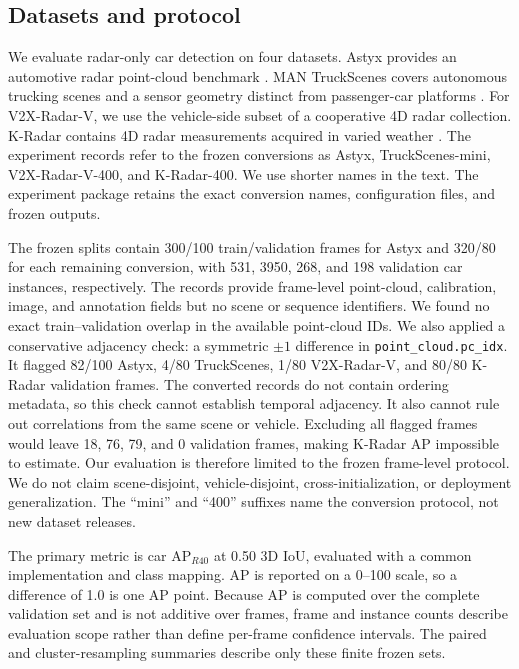 \documentclass[sensors,article,submit,pdftex,moreauthors]{Definitions/mdpi}
\begin{document}
\subsection{Datasets and protocol}

We evaluate radar-only car detection on four datasets. Astyx provides an
automotive radar point-cloud benchmark \cite{meyer2019astyx}. MAN TruckScenes
covers autonomous trucking scenes and a sensor geometry distinct from
passenger-car platforms \cite{fent2024truckscenes}.
For V2X-Radar-V, we use the vehicle-side subset of a cooperative 4D radar
collection. K-Radar contains 4D radar measurements acquired in varied weather
\cite{paek2022kradar,yang2024v2xradar}. The experiment records refer to the
frozen conversions as Astyx, TruckScenes-mini, V2X-Radar-V-400, and
K-Radar-400. We use shorter names in the text. The experiment package retains
the exact conversion names, configuration files, and frozen outputs.

The frozen splits contain 300/100 train/validation frames for Astyx and 320/80
for each remaining conversion, with 531, 3950, 268, and 198 validation car
instances, respectively. The records provide frame-level point-cloud,
calibration, image, and annotation fields but no scene or sequence identifiers.
We found no exact train--validation overlap in the available point-cloud IDs.
We also applied a conservative adjacency check: a symmetric $\pm1$ difference
in \texttt{point\_cloud.pc\_idx}. It flagged 82/100 Astyx, 4/80 TruckScenes,
1/80 V2X-Radar-V, and 80/80 K-Radar validation frames. The converted records
do not contain ordering metadata, so this check cannot establish temporal
adjacency. It also cannot rule out correlations from the same scene or
vehicle. Excluding all flagged frames would leave 18, 76, 79, and 0 validation
frames, making K-Radar AP impossible to estimate. Our evaluation is therefore
limited to the frozen frame-level protocol. We do not claim scene-disjoint,
vehicle-disjoint, cross-initialization, or deployment generalization. The
``mini'' and ``400'' suffixes name the conversion protocol, not new dataset
releases.

The primary metric is car AP$_{R40}$ at 0.50 3D IoU, evaluated with a common
implementation and class mapping. AP is reported on a 0--100 scale, so a
difference of 1.0 is one AP point. Because AP is computed over the complete
validation set and is not additive over frames, frame and instance counts
describe evaluation scope rather than define per-frame confidence intervals.
The paired and cluster-resampling summaries describe only these finite frozen
sets.
\end{document}

